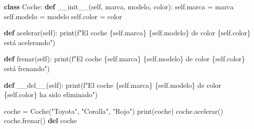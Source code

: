 \documentclass[
  a4paper,
  DIV=11,
  numbers=noendperiod,
  onepage,
  openany]{scrreprt}
\newenvironment{Shaded}{\begin{snugshade}}{\end{snugshade}}
\newcommand{\BuiltInTok}[1]{\textcolor[rgb]{0.00,0.23,0.31}{#1}}
\newcommand{\FunctionTok}[1]{\textcolor[rgb]{0.28,0.35,0.67}{#1}}
\newcommand{\KeywordTok}[1]{\textcolor[rgb]{0.00,0.23,0.31}{\textbf{#1}}}
\newcommand{\NormalTok}[1]{\textcolor[rgb]{0.00,0.23,0.31}{#1}}
\newcommand{\OperatorTok}[1]{\textcolor[rgb]{0.37,0.37,0.37}{#1}}
\newcommand{\SpecialCharTok}[1]{\textcolor[rgb]{0.37,0.37,0.37}{#1}}
\newcommand{\SpecialStringTok}[1]{\textcolor[rgb]{0.13,0.47,0.30}{#1}}
\newcommand{\StringTok}[1]{\textcolor[rgb]{0.13,0.47,0.30}{#1}}
\newcommand{\VariableTok}[1]{\textcolor[rgb]{0.07,0.07,0.07}{#1}}
\begin{document}
\begin{Shaded}
\begin{Highlighting}[]
\KeywordTok{class}\NormalTok{ Coche:}
    \KeywordTok{def} \FunctionTok{\_\_init\_\_}\NormalTok{(}\VariableTok{self}\NormalTok{, marca, modelo, color):}
        \VariableTok{self}\NormalTok{.marca }\OperatorTok{=}\NormalTok{ marca}
        \VariableTok{self}\NormalTok{.modelo }\OperatorTok{=}\NormalTok{ modelo}
        \VariableTok{self}\NormalTok{.color }\OperatorTok{=}\NormalTok{ color}

    \KeywordTok{def}\NormalTok{ acelerar(}\VariableTok{self}\NormalTok{):}
        \BuiltInTok{print}\NormalTok{(}\SpecialStringTok{f"El coche }\SpecialCharTok{\{}\VariableTok{self}\SpecialCharTok{.}\NormalTok{marca}\SpecialCharTok{\}}\SpecialStringTok{ }\SpecialCharTok{\{}\VariableTok{self}\SpecialCharTok{.}\NormalTok{modelo}\SpecialCharTok{\}}\SpecialStringTok{ de color }\SpecialCharTok{\{}\VariableTok{self}\SpecialCharTok{.}\NormalTok{color}\SpecialCharTok{\}}\SpecialStringTok{ está acelerando"}\NormalTok{)}

    \KeywordTok{def}\NormalTok{ frenar(}\VariableTok{self}\NormalTok{):}
        \BuiltInTok{print}\NormalTok{(}\SpecialStringTok{f"El coche }\SpecialCharTok{\{}\VariableTok{self}\SpecialCharTok{.}\NormalTok{marca}\SpecialCharTok{\}}\SpecialStringTok{ }\SpecialCharTok{\{}\VariableTok{self}\SpecialCharTok{.}\NormalTok{modelo}\SpecialCharTok{\}}\SpecialStringTok{ de color }\SpecialCharTok{\{}\VariableTok{self}\SpecialCharTok{.}\NormalTok{color}\SpecialCharTok{\}}\SpecialStringTok{ está frenando"}\NormalTok{)}

    \KeywordTok{def} \FunctionTok{\_\_del\_\_}\NormalTok{(}\VariableTok{self}\NormalTok{):}
        \BuiltInTok{print}\NormalTok{(}\SpecialStringTok{f"El coche }\SpecialCharTok{\{}\VariableTok{self}\SpecialCharTok{.}\NormalTok{marca}\SpecialCharTok{\}}\SpecialStringTok{ }\SpecialCharTok{\{}\VariableTok{self}\SpecialCharTok{.}\NormalTok{modelo}\SpecialCharTok{\}}\SpecialStringTok{ de color }\SpecialCharTok{\{}\VariableTok{self}\SpecialCharTok{.}\NormalTok{color}\SpecialCharTok{\}}\SpecialStringTok{ ha sido eliminado"}\NormalTok{)}

\NormalTok{coche }\OperatorTok{=}\NormalTok{ Coche(}\StringTok{"Toyota"}\NormalTok{, }\StringTok{"Corolla"}\NormalTok{, }\StringTok{"Rojo"}\NormalTok{)}
\BuiltInTok{print}\NormalTok{(coche)}
\NormalTok{coche.acelerar()}
\NormalTok{coche.frenar()}
\KeywordTok{del}\NormalTok{ coche}
\end{Highlighting}
\end{Shaded}
\end{document}
